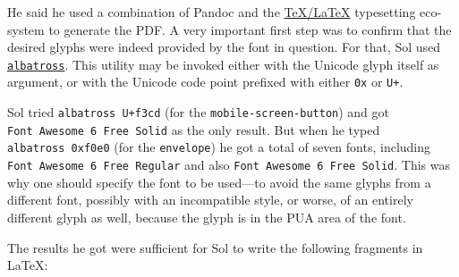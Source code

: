 \documentclass[
  british,
  a4paper,
  rgb,
  dvipsnames,
  svgnames,
  hyphens]{article}
\begin{document}
He said he used a combination of Pandoc and the
\href{https://www.tug.org/begin.html}{TeX/LaTeX} typesetting eco-system
to generate the PDF. A very important first step was to confirm that the
desired glyphs were indeed provided by the font in question. For that,
Sol used
\href{https://ctan.org/pkg/albatross?lang=en}{\texttt{albatross}}. This
utility may be invoked either with the Unicode glyph itself as argument,
or with the Unicode code point prefixed with either \texttt{0x} or
\texttt{U+}.

Sol tried \texttt{albatross\ U+f3cd} (for the
\texttt{mobile-screen-button}) and got
\texttt{Font\ Awesome\ 6\ Free\ Solid} as the only result. But when he
typed \texttt{albatross\ 0xf0e0} (for the \texttt{envelope}) he got a
total of seven fonts, including \texttt{Font\ Awesome\ 6\ Free\ Regular}
and also \texttt{Font\ Awesome\ 6\ Free\ Solid}. This was why one should
specify the font to be used---to avoid the same glyphs from a different
font, possibly with an incompatible style, or worse, of an entirely
different glyph as well, because the glyph is in the PUA area of the
font.

The results he got were sufficient for Sol to write the following
fragments in LaTeX:
\end{document}
